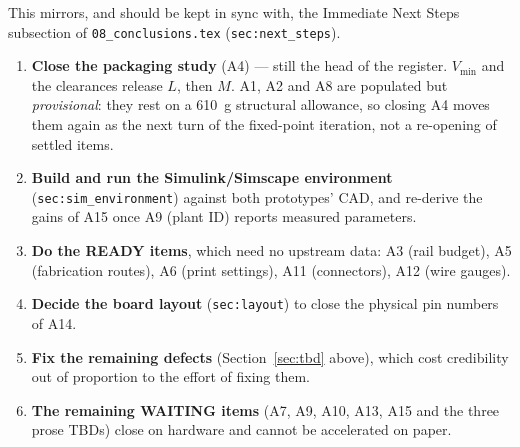 \documentclass[11pt,a4paper]{article}
\newcommand{\ready}{\textcolor{readycol}{\textbf{READY}}}
\newcommand{\waiting}{\textcolor{waitcol}{\textbf{WAITING}}}
\begin{document}
This mirrors, and should be kept in sync with, the Immediate Next Steps
subsection of \texttt{08\_conclusions.tex} (\texttt{sec:next\_steps}).

\begin{enumerate}
  \item \textbf{Close the packaging study} (A4) --- still the head of the
        register. $V_{\min}$ and the clearances release $L$, then $M$. A1, A2
        and A8 are populated but \emph{provisional}: they rest on a
        \qty{610}{\gram} structural allowance, so closing A4 moves them again
        as the next turn of the fixed-point iteration, not a re-opening of
        settled items.
  \item \textbf{Build and run the Simulink/Simscape environment}
        (\texttt{sec:sim\_environment}) against both prototypes' CAD, and
        re-derive the gains of A15 once A9 (plant ID) reports measured
        parameters.
  \item \textbf{Do the \ready{} items}, which need no upstream data: A3 (rail
        budget), A5 (fabrication routes), A6 (print settings), A11
        (connectors), A12 (wire gauges).
  \item \textbf{Decide the board layout} (\texttt{sec:layout}) to close the
        physical pin numbers of A14.
  \item \textbf{Fix the remaining defects} (Section~\ref{sec:tbd} above),
        which cost credibility out of proportion to the effort of fixing
        them.
  \item \textbf{The remaining \waiting{} items} (A7, A9, A10, A13, A15 and the
        three prose TBDs) close on hardware and cannot be accelerated on
        paper.
\end{enumerate}
\end{document}
